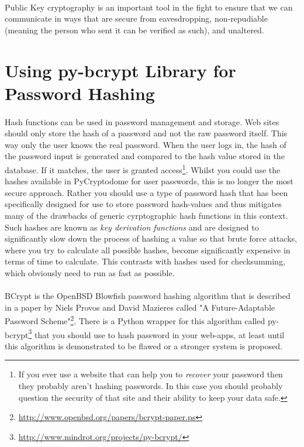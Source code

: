 \documentclass[12pt, a4paper, oneside]{book}
\begin{document}
{\paragraph{} Public Key cryptography is an important tool in the fight to ensure that we can communicate in ways that are secure from eavesdropping, non-repudiable (meaning the person who sent it can be verified as such), and unaltered.

\section{Using py-bcrypt Library for Password Hashing}
\label{py-bcrypt}
\paragraph{} Hash functions can be used in password management and storage. Web sites should only store the hash of a password and not the raw password itself. This way only the user knows the real password. When the user logs in, the hash of the password input is generated and compared to the hash value stored in the database. If it matches, the user is granted access\footnote{If you ever use a website that can help you to \emph{recover} your password then they probably aren't hashing passwords. In this case you should probably question the security of that site and their ability to keep your data safe.}. Whilst you could use the hashes available in PyCryptodome for user passwords, this is no longer the most secure approach. Rather you should use a type of password hash that has been specifically designed for use to store password hash-values and thus mitigates many of the drawbacks of generic cyrptographic hash functions in this context. Such hashes are known as \emph{key derivation functions} and are designed to significantly slow down the process of hashing a value so that brute force attacks, where you try to calculate all possible hashes, become significantly expensive in terms of time to calculate. This contrasts with hashes used for checksumming, which obviously need to run as fast as possible. 

\paragraph{} BCrypt is the OpenBSD Blowfish password hashing algorithm that is described in a paper by Niels Provos and David Mazieres called "A Future-Adaptable Password Scheme"\footnote{\url{http://www.openbsd.org/papers/bcrypt-paper.ps}}. There is a Python wrapper for this algorithm called py-bcrypt\footnote{\url{http://www.mindrot.org/projects/py-bcrypt/}} that you should use to hash password in your web-apps, at least until this algorithm is demonstrated to be flawed or a stronger system is proposed.

}
\end{document}
